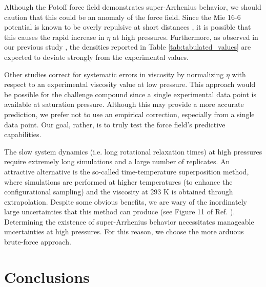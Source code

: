 \documentclass[preprint,review,12pt]{elsarticle}
\begin{document}
    Although the Potoff force field demonstrates super-Arrhenius behavior, we should caution that this could be an anomaly of the force field. Since the Mie 16-6 potential is known to be overly repulsive at short distances \cite{Postdoc_2,Postdoc_3}, it is possible that this causes the rapid increase in $\eta$ at high pressures. Furthermore, as observed in our previous study \cite{Postdoc_2}, the densities reported in Table \ref{tab:tabulated_values} are expected to deviate strongly from the experimental values.
    
	
	Other studies \cite{Liu2015} correct for systematic errors in viscosity by normalizing $\eta$ with respect to an experimental viscosity value at low pressure. This approach would be possible for the challenge compound since a single experimental data point is available at saturation pressure. Although this may provide a more accurate prediction, we prefer not to use an empirical correction, especially from a single data point. Our goal, rather, is to truly test the force field's predictive capabilities.
	
	The slow system dynamics (i.e. long rotational relaxation times) at high pressures require extremely long simulations and a large number of replicates. An attractive alternative is the so-called time-temperature superposition method, where simulations are performed at higher temperatures (to enhance the configurational sampling) and the viscosity at 293 K is obtained through extrapolation. Despite some obvious benefits, we are wary of the inordinately large uncertainties that this method can produce (see Figure 11 of Ref. ). Determining the existence of super-Arrhenius behavior necessitates manageable uncertainties at high pressures. For this reason, we choose the more arduous brute-force approach.	

	
%	
	
	\section{Conclusions} \label{Conclusions}
	
\end{document}
